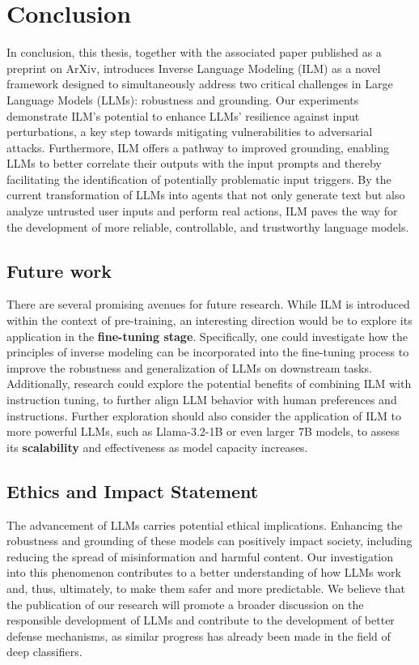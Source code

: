 \documentclass[../thesis.tex]{subfiles}
\begin{document}
\chapter{Conclusion}
In conclusion, this thesis, together with the associated paper published as a preprint on ArXiv, introduces Inverse Language Modeling (ILM) as a novel framework designed to simultaneously address two critical challenges in Large Language Models (LLMs): robustness and grounding.
Our experiments demonstrate ILM's potential to enhance LLMs' resilience against input perturbations, a key step towards mitigating vulnerabilities to adversarial attacks.
Furthermore, ILM offers a pathway to improved grounding, enabling LLMs to better correlate their outputs with the input prompts and thereby facilitating the identification of potentially problematic input triggers.
By the current transformation of LLMs into agents that not only generate text but also analyze untrusted user inputs and perform real actions, ILM paves the way for the development of more reliable, controllable, and trustworthy language models.

\section*{Future work}
There are several promising avenues for future research.
While ILM is introduced within the context of pre-training, an interesting direction would be to explore its application in the \textbf{fine-tuning stage}.  Specifically, one could investigate how the principles of inverse modeling can be incorporated into the fine-tuning process to improve the robustness and generalization of LLMs on downstream tasks.  Additionally, research could explore the potential benefits of combining ILM with instruction tuning, to further align LLM behavior with human preferences and instructions.
Further exploration should also consider the application of ILM to more powerful LLMs, such as Llama-3.2-1B or even larger 7B models, to assess its \textbf{scalability} and effectiveness as model capacity increases.

\clearpage
\section*{Ethics and Impact Statement}
The advancement of LLMs carries potential ethical implications. Enhancing the robustness and grounding of these models can positively impact society, including reducing the spread of misinformation and harmful content. Our investigation into this phenomenon contributes to a better understanding of how LLMs work and, thus, ultimately, to make them safer and more predictable. We believe that the publication of our research will promote a broader discussion on the responsible development of LLMs and contribute to the development of better defense mechanisms, as similar progress has already been made in the field of deep classifiers.


\subbib{}
\end{document}
